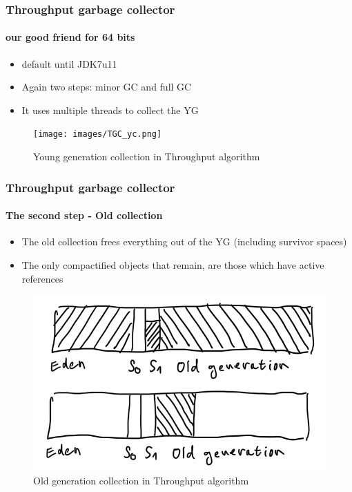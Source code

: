 \documentclass{beamer}
\begin{document}
\begin{frame}
    \frametitle{Throughput garbage collector}
    \framesubtitle{our good friend for 64 bits}
    \begin{itemize}
        \item default until JDK7u11
        \item Again two steps: minor GC and full GC 
        \item It uses multiple threads to collect the YG
    \end{itemize}
    \begin{figure}
        \texttt{[image: images/TGC\_yc.png]}
        \caption[tgc_yc]{Young generation collection in Throughput algorithm}
    \end{figure}
\end{frame}

\begin{frame}
    \frametitle{Throughput garbage collector}
    \framesubtitle{The second step - Old collection}
    \begin{itemize}
        \item The old collection frees everything out of the YG (including survivor spaces)
        \item The only compactified objects that remain, are those which have active references
    \end{itemize}
    \begin{figure}
        \includegraphics[width = \textwidth]{images/TGC_og.png}
        \caption[tgc_og]{Old generation collection in Throughput algorithm}
    \end{figure}
\end{frame}
\end{document}
